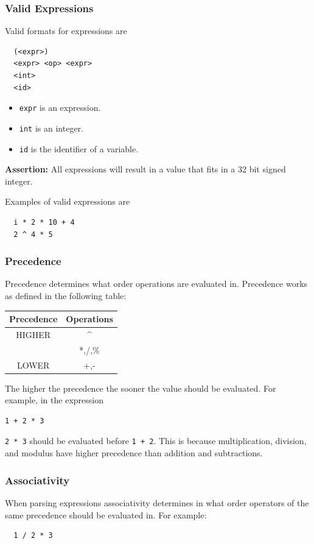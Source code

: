 \documentclass{article}
\newcommand{\code}[1]{\texttt{\textmd{#1}}}
\newcommand{\assertion}[1]{\textbf{Assertion: }#1}
\begin{document}
\subsubsection{Valid Expressions}
Valid formats for expressions are
\begin{lstlisting}
  (<expr>)
  <expr> <op> <expr>
  <int>
  <id>
\end{lstlisting}

\begin{itemize}
  \item \code{expr} is an expression.
  \item \code{int} is an integer.
  \item \code{id} is the identifier of a variable.
\end{itemize}

\assertion{All expressions will result in a value that fits in a 32 bit signed integer.}

Examples of valid expressions are
\begin{lstlisting}
  i * 2 * 10 + 4
  2 ^ 4 * 5
\end{lstlisting}

\subsubsection{Precedence}
Precedence determines what order operations are evaluated in. Precedence works as defined in the following
table:

\begin{center}
  \begin{tabular}{|c|c|}
    \hline
    \textbf{Precedence} & \textbf{Operations} \\
    \hline
    HIGHER & \textasciicircum \\
           & *,/,\% \\
    LOWER  & +,- \\
    \hline
  \end{tabular}
\end{center}

The higher the precedence the sooner the value should be evaluated. For example, in the expression
\begin{lstlisting}
1 + 2 * 3
\end{lstlisting}
\code{2 * 3} should be evaluated before \code{1 + 2}. This is because multiplication, division, and modulus
have higher precedence than addition and subtractions.

\subsubsection{Associativity}
When parsing expressions associativity determines in what order operators of the same precedence
should be evaluated in. For example:
\begin{lstlisting}
  1 / 2 * 3
\end{lstlisting}
\end{document}
